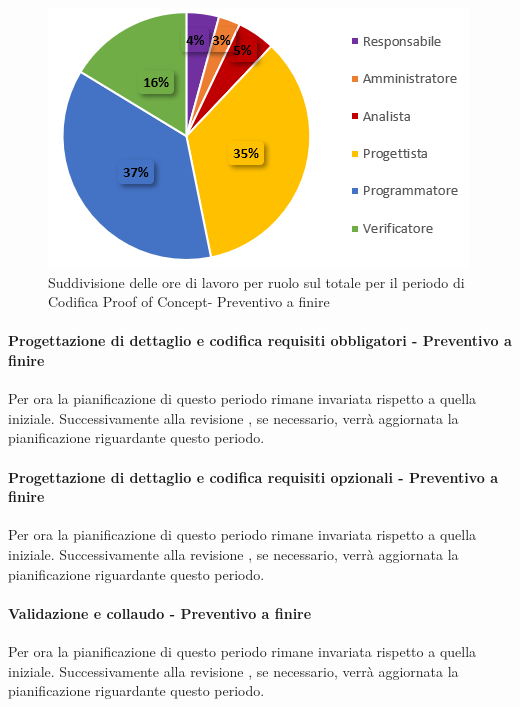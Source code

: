 \begin{figure}[H]
  \centering
  \includegraphics[scale=0.9]{immagini/ore_ruolo_preventivo_finire_PoC.png}
  \caption{Suddivisione delle ore di lavoro per ruolo sul totale per il periodo di Codifica Proof of Concept- Preventivo a finire}
\end{figure}



\paragraph{Progettazione di dettaglio e codifica requisiti obbligatori - Preventivo a finire} \label{paragraph:preventivo_finire_reqObbligatori}
Per ora la pianificazione di questo periodo rimane invariata rispetto a quella iniziale.
Successivamente alla revisione \RTB{}, se necessario, verrà aggiornata la pianificazione riguardante questo periodo.
\paragraph{Progettazione di dettaglio e codifica requisiti opzionali - Preventivo a finire} \label{paragraph:preventivo_finire_reqOpzionali}
Per ora la pianificazione di questo periodo rimane invariata rispetto a quella iniziale.
Successivamente alla revisione \RTB{}, se necessario, verrà aggiornata la pianificazione riguardante questo periodo.
\paragraph{Validazione e collaudo - Preventivo a finire} \label{paragraph:preventivo_finire_Validazione}
Per ora la pianificazione di questo periodo rimane invariata rispetto a quella iniziale.
Successivamente alla revisione \RTB{}, se necessario, verrà aggiornata la pianificazione riguardante questo periodo.

